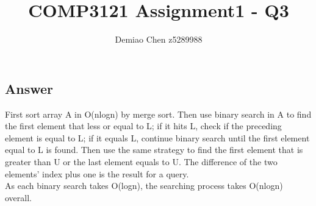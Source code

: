 \documentclass[12pt]{article}
\title{COMP3121 Assignment1 - Q3}
\author{Demiao Chen z5289988}
\begin{document}
\maketitle


\subsection*{Answer}
First sort array A in O(nlogn) by merge sort. Then use binary search in A to find
the first element that less or equal to L; if it hits L, check if the 
preceding element is equal to L; if it equals L, continue binary search until 
the first element equal to L is found. Then use the same strategy to find the first 
element that is greater than U or the last element equals to U. The difference of the 
two elements' index plus one is the result for a query.\\
As each binary search takes O(logn), the searching process takes O(nlogn) overall.
\end{document}
